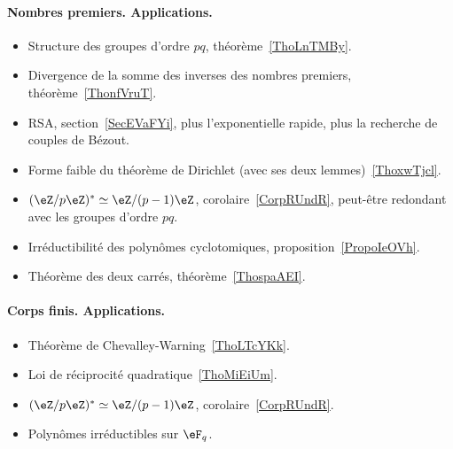 \paragraph{Nombres premiers. Applications.}
\begin{itemize}
    \item Structure des groupes d'ordre \( pq\), théorème~\ref{ThoLnTMBy}.
    \item Divergence de la somme des inverses des nombres premiers, théorème~\ref{ThonfVruT}.
    \item RSA, section~\ref{SecEVaFYi}, plus l'exponentielle rapide, plus la recherche de couples de Bézout.
    \item Forme faible du théorème de Dirichlet (avec ses deux lemmes)~\ref{ThoxwTjcl}.
    \item \( (\eZ/p\eZ)^*\simeq \eZ/(p-1)\eZ\), corolaire~\ref{CorpRUndR}, peut-être redondant avec les groupes d'ordre \( pq\).
    \item Irréductibilité des polynômes cyclotomiques, proposition~\ref{PropoIeOVh}.
    \item Théorème des deux carrés, théorème~\ref{ThospaAEI}.
\end{itemize}
\paragraph{Corps finis. Applications.}
\begin{itemize}
    \item Théorème de Chevalley-Warning~\ref{ThoLTcYKk}.
    \item Loi de réciprocité quadratique~\ref{ThoMiEiUm}.
    \item \( (\eZ/p\eZ)^*\simeq \eZ/(p-1)\eZ\), corolaire~\ref{CorpRUndR}.
    \item Polynômes irréductibles sur \( \eF_q\).
\end{itemize}


